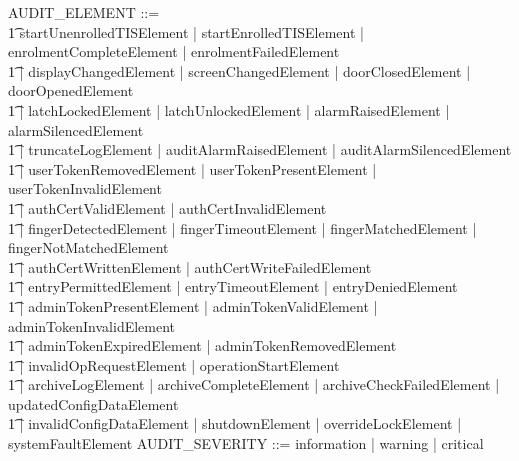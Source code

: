 \begin{zed}
	AUDIT\_ELEMENT ::= 
\\ \t1        startUnenrolledTISElement
        | startEnrolledTISElement
        | enrolmentCompleteElement
        | enrolmentFailedElement
\\ \t1       | displayChangedElement
        | screenChangedElement
        | doorClosedElement
        | doorOpenedElement
\\ \t1        | latchLockedElement
        | latchUnlockedElement
        | alarmRaisedElement
        | alarmSilencedElement
\\ \t1        | truncateLogElement
        | auditAlarmRaisedElement
        | auditAlarmSilencedElement
\\ \t1        | userTokenRemovedElement
        | userTokenPresentElement
        | userTokenInvalidElement
\\ \t1        | authCertValidElement
        | authCertInvalidElement
\\ \t1        | fingerDetectedElement
        | fingerTimeoutElement
        | fingerMatchedElement
        | fingerNotMatchedElement
\\ \t1        | authCertWrittenElement
        | authCertWriteFailedElement
\\ \t1        | entryPermittedElement
        | entryTimeoutElement
        | entryDeniedElement
\\ \t1        | adminTokenPresentElement
        | adminTokenValidElement
        | adminTokenInvalidElement
\\ \t1  | adminTokenExpiredElement
        | adminTokenRemovedElement
\\ \t1        | invalidOpRequestElement
        | operationStartElement
\\ \t1        | archiveLogElement
        | archiveCompleteElement
        | archiveCheckFailedElement
        | updatedConfigDataElement
\\ \t1        | invalidConfigDataElement
        | shutdownElement
        | overrideLockElement
        | systemFaultElement
\also
        AUDIT\_SEVERITY ::= information | warning | critical
\end{zed}

